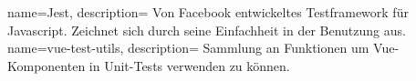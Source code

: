  {
  name=Jest,
  description={
    Von Facebook entwickeltes Testframework für Javascript. Zeichnet sich durch seine Einfachheit in der Benutzung aus.
  }
}
 {
  name=vue-test-utils,
  description={
    Sammlung an Funktionen um Vue-Komponenten in Unit-Tests verwenden zu können.
  }
}

